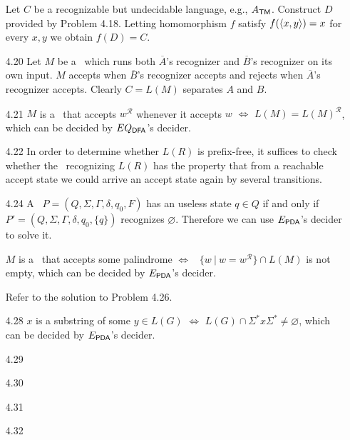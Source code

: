 \begin{itemize}
	\item[\Star 4.19]
	Let $C$ be a recognizable but undecidable language, e.g., $A_{\TM}$. Construct $D$ provided by Problem 4.18. Letting homomorphism $f$ satisfy $f(\Bra{x,y}) = x$ for every $x,y$ we obtain $f(D) = C$.
	
	\item[4.20]
	Let $M$ be a \TM \ which runs both $\overline{A}$'s recognizer and $\overline{B}$'s recognizer on its own input. $M$ accepts when $\overline{B}$'s recognizer accepts and rejects when $\overline{A}$'s recognizer accepts. Clearly $C = L(M)$ separates $A$ and $B$.
	
	\item[4.21]
	$M$ is a \DFA \ that accepts $w^\mathcal{R}$ whenever it accepts $w$ $\iff$ $L(M) = L(M)^\mathcal{R}$, which can be decided by $EQ_{\DFA}$'s decider.
	
	\item[4.22]
	In order to determine whether $L(R)$ is prefix-free, it suffices to check whether the \DFA \ recognizing $L(R)$ has the property that from a reachable accept state we could arrive an accept state again by several transitions.
	
	\item[\Star 4.23]
	\Omit
	
	\item[4.24]
	A \PDA \ $P = (Q, \Sigma, \Gamma, \delta, q_0, F)$ has an useless state $q \in Q$ if and only if \PDA \ $P' = (Q, \Sigma, \Gamma, \delta, q_0, \{q\})$ recognizes $\varnothing$. Therefore we can use $E_{\PDA}$'s decider to solve it.
	
	\item[\Star 4.25]
	\Omit
	
	\item[\Star 4.26] 
	$M$ is a \DFA \ that accepts some palindrome $\iff$ \CFL \ $\{ w \ | \ w = w^{\mathcal{R}} \} \cap L(M)$ is not empty, which can be decided by $E_{\PDA}$'s decider.
	
	\item[\Star 4.27] 
	Refer to the solution to Problem 4.26.
	
	\item[4.28]
	$x$ is a substring of some $y \in L(G)$ $\iff$ $L(G) \cap \Sigma^* x \Sigma^* \neq \varnothing$, which can be decided by $E_{\PDA}$'s decider.
	
	\item[4.29]
	\Empty
	
	\item[4.30]
	\Empty		
	
	\item[4.31]
	\Empty
	
	\item[4.32]
	\Empty
	
\end{itemize}